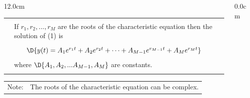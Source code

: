 \begin{frame}
\begin{columns}
\begin{column}{12.0cm}
\begin{center}
{%
\begin{tabular}{|p{0.4cm}p{10.9cm}|}
	\hline
	\hline
	&\\
	\THM & If $r_1, r_2, ..., r_M$ are the roots of the characteristic equation then the solution of (1) is \\
	&\\
	\multicolumn{2}{|c|}{$\D{y(t) = A_1 e^{r_1t} + A_2 e^{r_2t} + \dots + A_{M-1} e^{r_{M-1}t} + A_M e^{r_Mt}}$}\\
	&\\
	& where $\D{A_1, A_2, ... A_{M-1}, A_M}$ are constants. \\
	&\\
	\hline
	\hline
\end{tabular}}
\end{center}

{\setlength{\extrarowheight}{-0.1cm}
\begin{tabular}{p{0.45cm}p{11.6cm}|}
	Note: & The roots of the characteristic equation can be complex. \\
\end{tabular}}

\vspace{0.2cm}

\end{column}\begin{column}{0.0cm}\end{column}\end{columns}
\end{frame}

